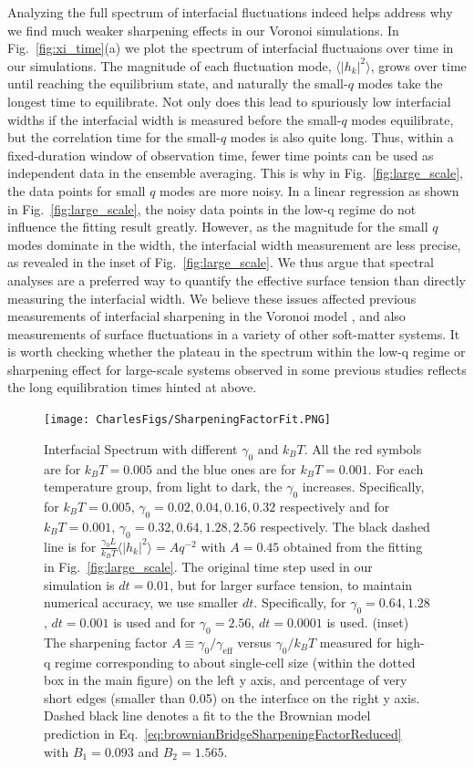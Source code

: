 \documentclass[twoside,twocolumn,9pt]{article}
\begin{document}
Analyzing the full spectrum of interfacial fluctuations indeed helps address why we find much weaker sharpening effects in our Voronoi simulations. In Fig.~\ref{fig:xi_time}(a) we plot the spectrum of interfacial fluctuaions over time in our simulations. The magnitude of each fluctuation mode, $\langle|h_k|^2\rangle$, grows over time until reaching the equilibrium state, and naturally the small-$q$ modes take the longest time to equilibrate. Not only does this lead to spuriously low interfacial widths if the interfacial width is measured before the small-$q$ modes equilibrate, but the correlation time for the small-$q$ modes is also quite long. Thus, within a fixed-duration window of observation time, fewer time points can be used as independent data in the ensemble averaging. This is why in Fig.~\ref{fig:large_scale}, the data points for small $q$ modes are more noisy. In a linear regression as shown in Fig.~\ref{fig:large_scale}, the noisy data points in the low-q regime  do not influence the fitting result greatly. However, as the magnitude for the small $q$ modes dominate in the width, the interfacial width measurement are less precise, as revealed in the inset of Fig.~\ref{fig:large_scale}. We thus argue that spectral analyses are a preferred way to quantify the effective surface tension than directly measuring the interfacial width. We believe these issues affected previous measurements of interfacial sharpening in the Voronoi model \cite{sussman2018soft}, and also measurements of surface fluctuations in a variety of other soft-matter systems. It is worth checking whether the plateau in the spectrum within the low-q regime or sharpening effect for large-scale systems observed  in some previous studies reflects the long equilibration times hinted at above\cite{martinez2022morphological,del2019interface}.  

\begin{figure}[t]
    \centering
    \texttt{[image: CharlesFigs/SharpeningFactorFit.PNG]}
    \caption{Interfacial Spectrum with different $\gamma_0$ and $k_B T$. All the red symbols are for $k_BT=0.005$ and the blue ones are for $k_BT=0.001$. For each temperature group, from light to dark, the $\gamma_0$ increases. Specifically, for $k_B T=0.005$, $\gamma_0=0.02,0.04,0.16,0.32$ respectively and for $k_B T=0.001$, $\gamma_0=0.32,0.64,1.28,2.56$ respectively. The black dashed line is for $\frac{\gamma_0 L}{k_BT}\langle|h_k|^2\rangle = A q^{-2}$ with $A=0.45$ obtained from the fitting in Fig.~\ref{fig:large_scale}. The original time step used in our simulation is $dt=0.01$, but for larger surface tension, to maintain numerical accuracy, we use smaller $dt$. Specifically, for $\gamma_0=0.64,1.28$, $dt=0.001$ is used and for $\gamma_0=2.56$, $dt=0.0001$ is used. (inset) The sharpening factor $A\equiv \gamma_0/\gamma_{\text{eff}}$ versus $\gamma_0/k_BT$ measured for high-q regime corresponding to about single-cell size (within the dotted box in the main figure) on the left y axis, and percentage of very short edges (smaller than 0.05) on the interface on the right y axis. Dashed black line denotes a fit to the the Brownian model prediction in Eq.~\ref{eq:brownianBridgeSharpeningFactorReduced} with $B_{1}=0.093$ and $B_{2}=1.565$.} 
    \label{fig:varyinggamma}
\end{figure}
\end{document}
